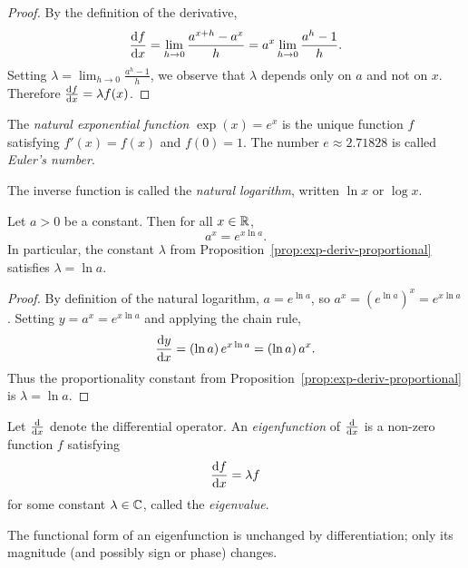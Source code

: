 \documentclass[a4paper]{article}
\begin{document}
\begin{proof}
  By the definition of the derivative,
  \[
    \frac{\mathrm{d} f}{\mathrm{d} x} = \lim_{h\to 0}\frac{a^{x+h}-a^x}{h} = a^x\lim_{h\to 0}\frac{a^h-1}{h}.
  \]
  Setting $\lambda = \lim_{h\to 0}\frac{a^h-1}{h}$, we observe that $\lambda$ depends only on $a$ and not on $x$. Therefore $\frac{\mathrm{d} f}{\mathrm{d} x} = \lambda f(x)$.
\end{proof}

\begin{defi}
  The \emph{natural exponential function} $\exp(x) = e^x$ is the unique function $f$ satisfying $f'(x) = f(x)$ and $f(0) = 1$. The number $e \approx 2.71828$ is called \emph{Euler's number}.

  The inverse function is called the \emph{natural logarithm}, written $\ln x$ or $\log x$.
\end{defi}

\begin{prop}\label{prop:general-exp-via-natural}
  Let $a > 0$ be a constant. Then for all $x \in \mathbb{R}$,
  \[
    a^x = e^{x \ln a}.
  \]
  In particular, the constant $\lambda$ from Proposition~\ref{prop:exp-deriv-proportional} satisfies $\lambda = \ln a$.
\end{prop}

\begin{proof}
  By definition of the natural logarithm, $a = e^{\ln a}$, so $a^x = (e^{\ln a})^x = e^{x \ln a}$. Setting $y = a^x = e^{x\ln a}$ and applying the chain rule,
  \[
    \frac{\mathrm{d} y}{\mathrm{d} x} = (\ln a)\, e^{x\ln a} = (\ln a)\, a^x.
  \]
  Thus the proportionality constant from Proposition~\ref{prop:exp-deriv-proportional} is $\lambda = \ln a$.
\end{proof}

\begin{defi}
  Let $\frac{\mathrm{d}}{\mathrm{d} x}$ denote the differential operator. An \emph{eigenfunction} of $\frac{\mathrm{d}}{\mathrm{d} x}$ is a non-zero function $f$ satisfying
  \[
    \frac{\mathrm{d} f}{\mathrm{d} x} = \lambda f
  \]
  for some constant $\lambda \in \mathbb{C}$, called the \emph{eigenvalue}.
\end{defi}

\begin{remark}
  The functional form of an eigenfunction is unchanged by differentiation; only its magnitude (and possibly sign or phase) changes.
\end{remark}
\end{document}
